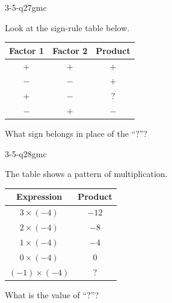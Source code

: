 \begin{practiceQuestion}{3-5-q27}{gmc}
\begin{questionText}
Look at the sign-rule table below.

\begin{center}
\begin{tabular}{|c|c|c|}
\hline
\textbf{Factor 1} & \textbf{Factor 2} & \textbf{Product} \\
\hline
$+$ & $+$ & $+$ \\
\hline
$-$ & $-$ & $+$ \\
\hline
$+$ & $-$ & $?$ \\
\hline
$-$ & $+$ & $-$ \\
\hline
\end{tabular}
\end{center}

What sign belongs in place of the ``$?$''?
\end{questionText}
\end{practiceQuestion}

\begin{practiceQuestion}{3-5-q28}{gmc}
\begin{questionText}
The table shows a pattern of multiplication.

\begin{center}
\begin{tabular}{|c|c|}
\hline
\textbf{Expression} & \textbf{Product} \\
\hline
$3 \times (-4)$ & $-12$ \\
\hline
$2 \times (-4)$ & $-8$ \\
\hline
$1 \times (-4)$ & $-4$ \\
\hline
$0 \times (-4)$ & $0$ \\
\hline
$(-1) \times (-4)$ & $?$ \\
\hline
\end{tabular}
\end{center}

What is the value of ``$?$''?
\end{questionText}
\end{practiceQuestion}

